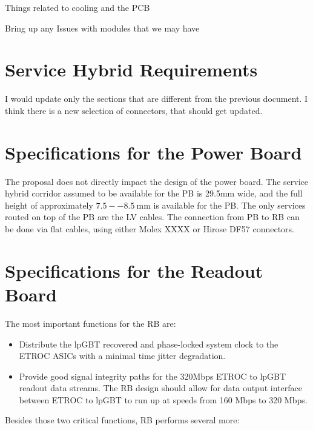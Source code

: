 \documentclass[11pt]{article}
\begin{document}
Things related to cooling and the PCB

Bring up any Issues with modules that we may have

\section{Service Hybrid Requirements}

I would update only the sections that are different from the previous
document. I think there is a new selection of connectors, that should
get updated.

\section{Specifications for the Power Board}

The proposal does not directly impact the design of the power board.
The service hybrid corridor assumed to be available for the PB is 29.5mm wide, and the full height of approximately $7.5--8.5~\mathrm{mm}$ is available for the PB.
The only services routed on top of the PB are the LV cables.
The connection from PB to RB can be done via flat cables, using either Molex XXXX or Hirose DF57 connectors.

\section{Specifications for the Readout Board}

The most important functions for the RB are:

\begin{itemize}
  \item Distribute the lpGBT recovered and phase-locked system clock to the ETROC ASICs with a minimal time jitter degradation.
  \item Provide good signal integrity paths for the 320Mbps ETROC to lpGBT readout data streams. The RB design should allow for data output interface between ETROC to lpGBT to run up at speeds from 160 Mbps to
    320 Mbps.
\end{itemize}

Besides those two critical functions, RB performs several more:
\end{document}

